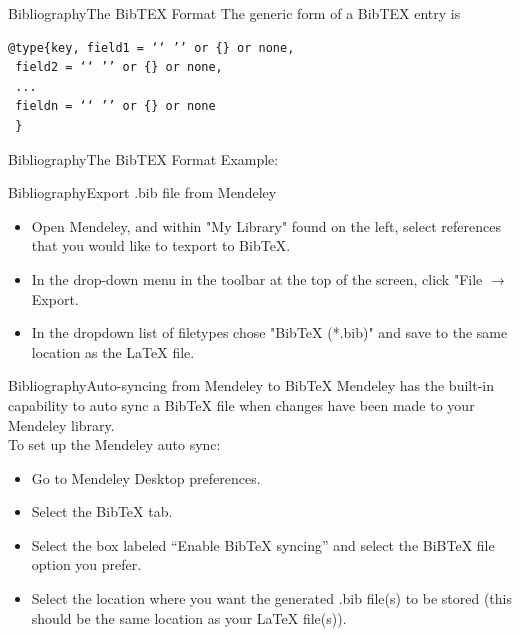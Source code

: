 \documentclass{beamer}
\begin{document}
\begin{darkframes}
\begin{frame}[fragile]{Bibliography}{The BibTEX Format}
	The generic form of a BibTEX entry is
	\begin{center}
	\begin{verbatim}
@type{key, field1 = ‘‘ ’’ or {} or none,
 field2 = ‘‘ ’’ or {} or none, 
 ... 
 fieldn = ‘‘ ’’ or {} or none 
 }
	\end{verbatim}
\end{center}
\end{frame}

\begin{frame}[fragile]{Bibliography}{The BibTEX Format}
	\alert{Example:}
\end{frame}

\begin{frame}[<+->]{Bibliography}{Export .bib file from Mendeley}
\begin{itemize}
	\item Open Mendeley, and within "My Library" found on the left, select references that you would like to texport to BibTeX.
	\item In the drop-down menu in the toolbar at the top of the screen, click "File $\rightarrow$ Export.
	\item In the dropdown list of filetypes chose "BibTeX (*.bib)" and save to the same location as the LaTeX file.
\end{itemize}
\end{frame}


\begin{frame}[<+->]{Bibliography}{Auto-syncing from Mendeley to BibTeX}
	Mendeley has the built-in capability to auto sync a BibTeX file when changes have been made to your Mendeley library.\\
	To set up the Mendeley auto sync:
	\begin{itemize}
		\item Go to Mendeley Desktop preferences.
		\item Select the BibTeX tab. 
		\item Select the box labeled “Enable BibTeX syncing” and select the BiBTeX file option you prefer.
		\item Select the location where you want the generated .bib file(s) to be stored (this should be the same location as your LaTeX file(s)).
	\end{itemize}
\end{frame}


\end{darkframes}
\end{document}
